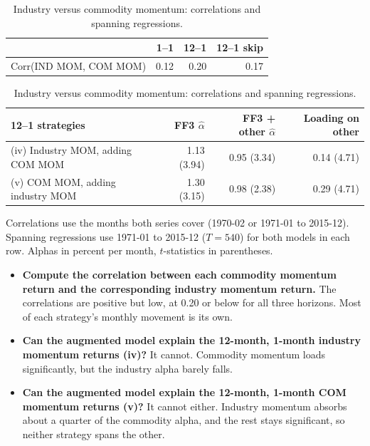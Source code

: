 \documentclass[11pt]{article}
\begin{document}
\begin{table}[H]
\centering
\caption{Industry versus commodity momentum: correlations and spanning regressions.}
\small
\begin{tabular}{lrrr}
\toprule
& 1--1 & 12--1 & 12--1 skip \\
\midrule
Corr(IND MOM, COM MOM) & 0.12 & 0.20 & 0.17 \\
\bottomrule
\end{tabular}

\vspace{8pt}
\begin{tabular}{lrrr}
\toprule
12--1 strategies & FF3 $\hat\alpha$ & FF3 + other $\hat\alpha$ & Loading on other \\
\midrule
(iv) Industry MOM, adding COM MOM & 1.13 (3.94) & 0.95 (3.34) & 0.14 (4.71) \\
(v) COM MOM, adding industry MOM & 1.30 (3.15) & 0.98 (2.38) & 0.29 (4.71) \\
\bottomrule
\end{tabular}
\vspace{2pt}\begin{minipage}{0.85\textwidth}\footnotesize
Correlations use the months both series cover (1970-02 or 1971-01 to 2015-12). Spanning regressions use 1971-01 to 2015-12 ($T = 540$) for both models in each row. Alphas in percent per month, $t$-statistics in parentheses.
\end{minipage}
\end{table}

\begin{itemize}
\setlength{\itemsep}{4pt}\setlength{\parskip}{0pt}

\item \textbf{Compute the correlation between each commodity momentum return and the corresponding industry momentum return.} The correlations are positive but low, at 0.20 or below for all three horizons. Most of each strategy's monthly movement is its own.

\item \textbf{Can the augmented model explain the 12-month, 1-month industry momentum returns (iv)?} It cannot. Commodity momentum loads significantly, but the industry alpha barely falls.

\item \textbf{Can the augmented model explain the 12-month, 1-month COM momentum returns (v)?} It cannot either. Industry momentum absorbs about a quarter of the commodity alpha, and the rest stays significant, so neither strategy spans the other.

\end{itemize}
\end{document}
